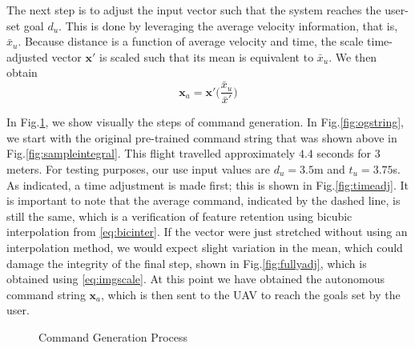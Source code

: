 \documentclass[letterpaper, 10 pt, conference]{ieeeconf}  %
\begin{document}
The next step is to adjust the input vector such that the system reaches the user-set goal $d_u$. This is done by leveraging the average velocity information, that is, $\bar{x}_u$. Because distance is a function of average velocity and time, the scale time-adjusted vector $\mathbf{x}'$ is scaled such that its mean is equivalent to $\bar{x}_u$. We then obtain
\begin{equation} \label{eq:imgscale}
\mathbf{x}_a = \mathbf{x}'\bigg(\frac{\bar{x}_u}{\bar{x}'}\bigg)
\end{equation}

In Fig.\ref{fig:gensample}, we show visually the steps of command generation. In Fig.\ref{fig:ogstring}, we start with the original pre-trained command string that was shown above in Fig.\ref{fig:sampleintegral}. This flight travelled approximately $4.4$ seconds for $3$ meters. For testing purposes, our use input values are $d_u=3.5$m and $t_u=3.75$s. As indicated, a time adjustment is made first; this is shown in Fig.\ref{fig:timeadj}. It is important to note that the average command, indicated by the dashed line, is still the same, which is a verification of feature retention using bicubic interpolation from \eqref{eq:bicinter}. If the vector were just stretched without using an interpolation method, we would expect slight variation in the mean, which could damage the integrity of the final step, shown in Fig.\ref{fig:fullyadj}, which is obtained using \eqref{eq:imgscale}. At this point we have obtained the autonomous command string $\mathbf{x}_a$, which is then sent to the UAV to reach the goals set by the user.


\begin{figure}[h]
	\centering
	\caption{Command Generation Process}
	\label{fig:gensample}
\end{figure}
\end{document}
